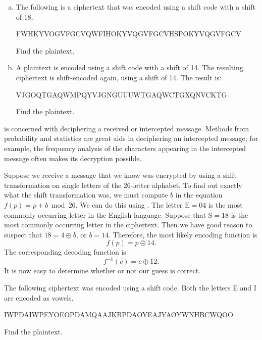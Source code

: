\begin{exercise}{}  
\begin{enumerate}[(a)]
\item
The following is a ciphertext that was encoded using a shift code with a shift of 18.

FWHKYVOGVFGCVQWFIHOKYVQGVFGCVHSPOKYVQGVFGCV

\noindent
Find the plaintext.
\item
A plaintext is encoded using a shift code with a shift of 14. The resulting ciphertext is shift-encoded again, using a shift of 14. The result is:

VJGOQTGAQWMPQYVJGNGUUUWTGAQWCTGXQNVCKTG

\noindent
Find the plaintext.
\end{enumerate}
\end{exercise}

 is concerned with
deciphering a received or intercepted message. Methods from
probability and statistics are great aids in deciphering an
intercepted message; for example, the frequency analysis of the
characters appearing in the intercepted message often makes its
decryption possible.  
 
\begin{example}{2}
Suppose we receive a message that we know was encrypted by using a
shift transformation on single letters of the 26-letter alphabet. To
find out exactly what the shift transformation was, we must compute
$b$ in the equation $f(p) = p + b \bmod 26$. We can do this using
.  
The letter $\mbox{E} = 04$ is the most commonly
occurring letter in the English language. Suppose that $\mbox{S} = 18$
is the most commonly occurring letter in the ciphertext.  Then we have
good reason to suspect that  $18 = 4 \oplus b $, or $b= 14$.
Therefore, the most likely encoding function is
$$
f(p) = p \oplus 14.
$$
The corresponding decoding function is
$$
f^{-1}(c) = c \oplus 12.
$$
It is now easy to determine whether or not our guess is correct.
\end{example}
 
\begin{exercise}{}  
The following ciphertext was encoded using a shift code. Both the letters E and I are encoded as vowels. 

IWPDAIWPEYOEOPDAMQAAJKBPDAOYEAJYAOYWNHBCWQOO

\noindent
Find the plaintext.
\end{exercise}

